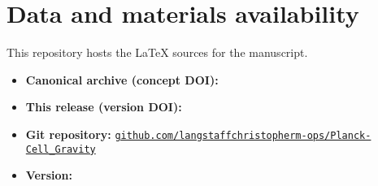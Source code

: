 \section*{Data and materials availability}
This repository hosts the \LaTeX{} sources for the manuscript.

\begin{itemize}
  \item \textbf{Canonical archive (concept DOI):}
  \href{https://doi.org/\RepoConceptDOI}{\RepoConceptDOI}

  \item \textbf{This release (version DOI):}
  \href{https://doi.org/\PaperDOI}{\PaperDOI}

  \item \textbf{Git repository:}
  \href{\RepoGitHubURL}{\texttt{github.com/langstaffchristopherm-ops/Planck-Cell\_Gravity}}

  \item \textbf{Version:} \PaperVersion
\end{itemize}

